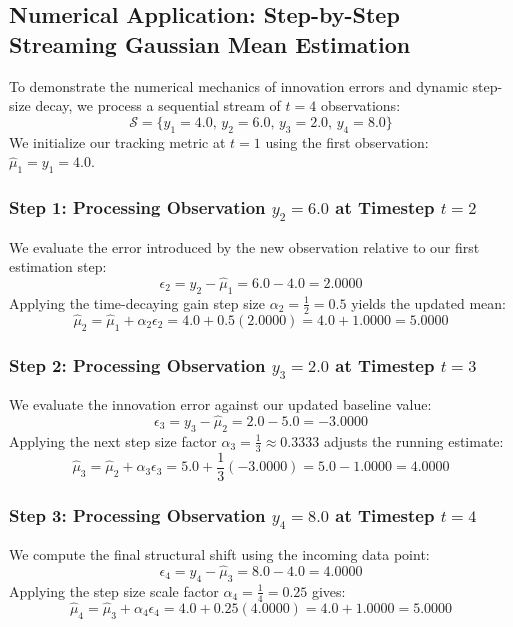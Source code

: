 \documentclass{article}
\begin{document}
\subsection{Numerical Application: Step-by-Step Streaming Gaussian Mean Estimation}

To demonstrate the numerical mechanics of innovation errors and dynamic step-size decay, we process a sequential stream of $t = 4$ observations:
\begin{equation}
\mathcal{S} = \{y_1 = 4.0, \, y_2 = 6.0, \, y_3 = 2.0, \, y_4 = 8.0\}
\end{equation}
We initialize our tracking metric at $t=1$ using the first observation: $\hat{\mu}_1 = y_1 = 4.0$.

\subsubsection{Step 1: Processing Observation $y_2 = 6.0$ at Timestep $t = 2$}
We evaluate the error introduced by the new observation relative to our first estimation step:
\begin{equation}
\epsilon_2 = y_2 - \hat{\mu}_1 = 6.0 - 4.0 = \mathbf{2.0000}
\end{equation}
Applying the time-decaying gain step size $\alpha_2 = \frac{1}{2} = 0.5$ yields the updated mean:
\begin{equation}
\hat{\mu}_2 = \hat{\mu}_1 + \alpha_2 \epsilon_2 = 4.0 + 0.5(2.0000) = 4.0 + 1.0000 = \mathbf{5.0000}
\end{equation}

\subsubsection{Step 2: Processing Observation $y_3 = 2.0$ at Timestep $t = 3$}
We evaluate the innovation error against our updated baseline value:
\begin{equation}
\epsilon_3 = y_3 - \hat{\mu}_2 = 2.0 - 5.0 = \mathbf{-3.0000}
\end{equation}
Applying the next step size factor $\alpha_3 = \frac{1}{3} \approx 0.3333$ adjusts the running estimate:
\begin{equation}
\hat{\mu}_3 = \hat{\mu}_2 + \alpha_3 \epsilon_3 = 5.0 + \frac{1}{3}(-3.0000) = 5.0 - 1.0000 = \mathbf{4.0000}
\end{equation}

\subsubsection{Step 3: Processing Observation $y_4 = 8.0$ at Timestep $t = 4$}
We compute the final structural shift using the incoming data point:
\begin{equation}
\epsilon_4 = y_4 - \hat{\mu}_3 = 8.0 - 4.0 = \mathbf{4.0000}
\end{equation}
Applying the step size scale factor $\alpha_4 = \frac{1}{4} = 0.25$ gives:
\begin{equation}
\hat{\mu}_4 = \hat{\mu}_3 + \alpha_4 \epsilon_4 = 4.0 + 0.25(4.0000) = 4.0 + 1.0000 = \mathbf{5.0000}
\end{equation}
\end{document}
